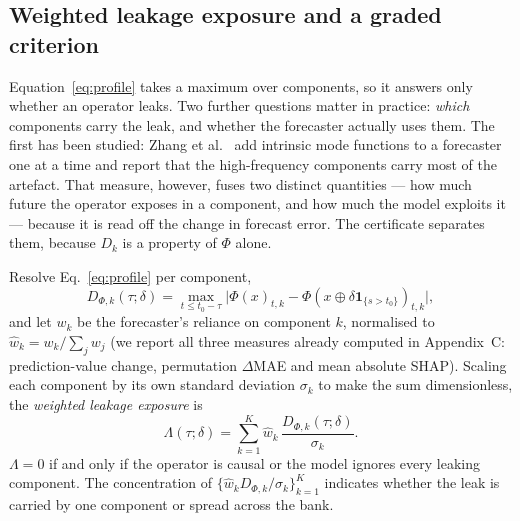 \documentclass[review,3p,times]{elsarticle}
\begin{document}
\subsection{Weighted leakage exposure and a graded criterion}\label{sec:exposure}

Equation~\eqref{eq:profile} takes a maximum over components, so it answers only
whether an operator leaks. Two further questions matter in practice: \emph{which}
components carry the leak, and whether the forecaster actually uses them. The
first has been studied: Zhang et al.~\cite{zhang2025} add intrinsic mode
functions to a forecaster one at a time and report that the high-frequency
components carry most of the artefact. That measure, however, fuses two distinct
quantities --- how much future the operator exposes in a component, and how much
the model exploits it --- because it is read off the change in forecast error.
The certificate separates them, because $D_k$ is a property of $\Phi$ alone.

Resolve Eq.~\eqref{eq:profile} per component,
\begin{equation}
D_{\Phi,k}(\tau;\delta)=
\max_{t\le t_0-\tau}
\bigl|\Phi(x)_{t,k}-\Phi\!\left(x\oplus\delta\mathbf 1_{\{s>t_0\}}\right)_{t,k}\bigr| ,
\label{eq:profilek}
\end{equation}
and let $w_k$ be the forecaster's reliance on component $k$, normalised to
$\hat w_k = w_k/\sum_j w_j$ (we report all three measures already computed in
Appendix~C: prediction-value change, permutation $\Delta$MAE and mean absolute
SHAP). Scaling each component by its own standard deviation $\sigma_k$ to make
the sum dimensionless, the \emph{weighted leakage exposure} is
\begin{equation}
\Lambda(\tau;\delta)=\sum_{k=1}^{K}\hat w_k\,\frac{D_{\Phi,k}(\tau;\delta)}{\sigma_k}.
\label{eq:exposure}
\end{equation}
$\Lambda=0$ if and only if the operator is causal or the model ignores every
leaking component. The concentration of
$\{\hat w_k D_{\Phi,k}/\sigma_k\}_{k=1}^{K}$ indicates whether the leak is
carried by one component or spread across the bank.
\end{document}
